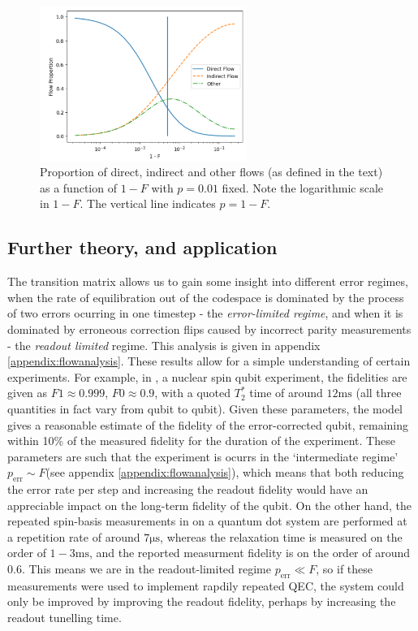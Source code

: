 \documentclass{report}
\begin{document}
\begin{figure}[ht]
        \centering
        \includegraphics[width=0.6\textwidth]{Figures/flow/p_fixed.png} %
        \caption{Proportion of direct, indirect and other flows (as defined in the text) as a function of $1-F$ with $p = 0.01$ fixed. Note the logarithmic scale in $1-F$. The vertical line indicates $p = 1-F$.}
        \label{fig:flowprop2}
\end{figure}

\subsection{Further theory, and application}
The transition matrix allows us to gain some insight into different error regimes, when the rate of equilibration out of the codespace is dominated by the process of two errors ocurring in one timestep - the \textit{error-limited regime}, and when it is dominated by erroneous correction flips caused by incorrect parity measurements - the \textit{readout limited} regime. This analysis is given in appendix \ref{appendix:flowanalysis}. These results allow for a simple understanding of certain experiments. For example, in \cite{Cramer2016}, a nuclear spin qubit experiment, the fidelities are given as $F1\approx0.999$, $F0\approx0.9$, with a quoted $T_2^*$ time of around $12\unit{\milli\second}$ (all three quantities in fact vary from qubit to qubit). Given these parameters, the model gives a reasonable estimate of the fidelity of the error-corrected qubit, remaining within 10\% of the measured fidelity for the duration of the experiment. These parameters are such that the experiment is ocurrs in the `intermediate regime' $p_{\text{err}}\sim F$(see appendix \ref{appendix:flowanalysis}), which means that both reducing the error rate per step and increasing the readout fidelity would have an appreciable impact on the long-term fidelity of the qubit. On the other hand, the repeated spin-basis measurements in \cite{Nakajima2019} on a quantum dot system are performed at a repetition rate of around $7\unit{\micro\second}$, whereas the relaxation time is measured on the order of $1-3\unit{\milli\second}$, and the reported measurment fidelity is on the order of around $0.6$.  This means we are in the readout-limited regime $p_{\text{err}}\ll F$, so if these measurements were used to implement rapdily repeated QEC, the system could only be improved by improving the readout fidelity, perhaps by increasing the readout tunelling time.
\end{document}
